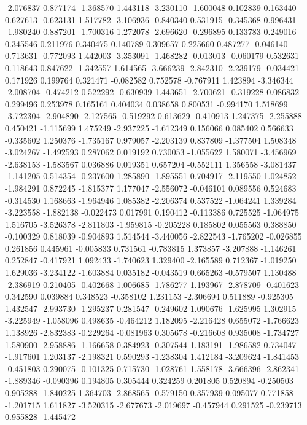 -2.076837
0.877174
-1.368570
1.443118
-3.230110
-1.600048
0.102839
0.163440
0.627613
-0.623131
1.517782
-3.106936
-0.840340
0.531915
-0.345368
0.996431
-1.980240
0.887201
-1.700316
1.272078
-2.696620
-0.296895
0.133783
0.249016
0.345546
0.211976
0.340475
0.140789
0.309657
0.225660
0.487277
-0.046140
0.713631
-0.772093
1.442003
-3.353091
-1.468282
-0.013013
-0.060179
0.532631
0.118643
0.847622
-1.342557
1.614565
-3.666239
-2.842310
-2.239179
-0.034421
0.171926
0.199764
0.321471
-0.082582
0.752578
-0.767911
1.423894
-3.346344
-2.008704
-0.474212
0.522292
-0.630939
1.443651
-2.700621
-0.319228
0.086832
0.299496
0.253978
0.165161
0.404034
0.038658
0.800531
-0.994170
1.518699
-3.722304
-2.904890
-2.127565
-0.519292
0.613629
-0.410913
1.247375
-2.255888
0.450421
-1.115699
1.475249
-2.937225
-1.612349
0.156066
0.085402
0.566633
-0.335602
1.250376
-1.735167
0.979057
-2.203139
0.837809
-1.377504
1.508348
-3.024267
-1.492593
0.287062
0.019192
0.730053
-1.055622
1.580071
-3.456969
-2.638153
-1.583567
0.036886
0.019351
0.657204
-0.552111
1.356558
-3.081437
-1.141205
0.514354
-0.237600
1.285890
-1.895551
0.704917
-2.119550
1.024852
-1.984291
0.872245
-1.815377
1.177047
-2.556072
-0.046101
0.089556
0.524683
-0.314530
1.168663
-1.964946
1.085382
-2.206374
0.537522
-1.064241
1.339284
-3.223558
-1.882138
-0.022473
0.017991
0.190412
-0.113386
0.725525
-1.064975
1.516705
-3.526378
-2.811803
-1.959815
-0.205228
0.185802
0.055563
0.388850
-0.100329
0.818039
-0.904893
1.514544
-3.440056
-2.822543
-1.765202
-0.026855
0.261856
0.445961
-0.005833
0.731561
-0.783815
1.373857
-3.207888
-1.146261
0.252847
-0.417921
1.092433
-1.740623
1.329400
-2.165589
0.712367
-1.019250
1.629036
-3.234122
-1.603884
0.035182
-0.043519
0.665263
-0.579507
1.130488
-2.386919
0.210405
-0.402668
1.006685
-1.786277
1.193967
-2.878709
-0.401623
0.342590
0.039884
0.348523
-0.358102
1.231153
-2.306694
0.511889
-0.925305
1.432547
-2.993730
-1.295237
0.281547
-0.249602
1.090676
-1.625995
1.302915
-3.225949
-1.058096
0.498635
-0.464212
1.182095
-2.216428
0.655072
-1.766623
1.138926
-2.832383
-0.229264
-0.081963
0.305678
-0.216608
0.935008
-1.734727
1.580900
-2.958886
-1.166658
0.384923
-0.307544
1.183191
-1.986582
0.734047
-1.917601
1.203137
-2.198321
0.590293
-1.238304
1.412184
-3.209624
-1.841453
-0.451803
0.290075
-0.101325
0.715730
-1.028761
1.558178
-3.666396
-2.862341
-1.889346
-0.090396
0.194805
0.305444
0.324259
0.201805
0.520894
-0.250503
0.905288
-1.840225
1.364703
-2.868565
-0.579150
0.357939
0.095077
0.771858
-1.201715
1.611827
-3.520315
-2.677673
-2.019697
-0.457944
0.291525
-0.239713
0.955828
-1.445472
